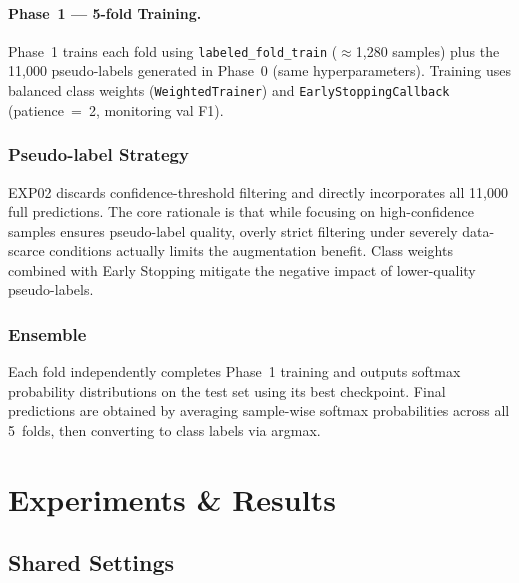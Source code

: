 \documentclass[10pt,twocolumn]{article}
\begin{document}
\paragraph{Phase~1 --- 5-fold Training.}
Phase~1 trains each fold using \texttt{labeled\_fold\_train}
($\approx$1,280 samples) plus the 11,000 pseudo-labels generated in
Phase~0 (same hyperparameters). Training uses balanced class weights
(\texttt{WeightedTrainer}) and \texttt{EarlyStoppingCallback}
(patience~=~2, monitoring val F1).

\subsubsection{Pseudo-label Strategy}
EXP02 discards confidence-threshold filtering and directly incorporates
all 11,000 full predictions. The core rationale is that while focusing
on high-confidence samples ensures pseudo-label quality, overly strict
filtering under severely data-scarce conditions actually limits the
augmentation benefit. Class weights combined with Early Stopping
mitigate the negative impact of lower-quality pseudo-labels.

\subsubsection{Ensemble}
Each fold independently completes Phase~1 training and outputs softmax
probability distributions on the test set using its best checkpoint.
Final predictions are obtained by averaging sample-wise softmax
probabilities across all 5~folds, then converting to class labels via
argmax.

\section{Experiments \& Results}

\subsection{Shared Settings}

\begin{table}[h]
\centering
\caption{Shared experimental settings}
\label{tab:shared}
\end{table}
\end{document}
